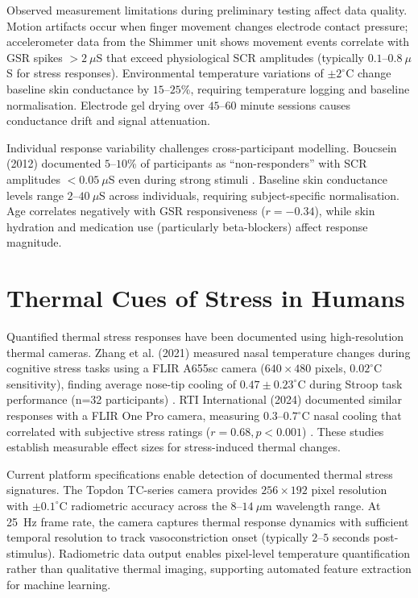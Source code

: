 \documentclass{report}
\begin{document}
Observed measurement limitations during preliminary testing affect data quality. Motion artifacts occur when finger movement changes electrode contact pressure; accelerometer data from the Shimmer unit shows movement events correlate with GSR spikes $>2~\mu$S that exceed physiological SCR amplitudes (typically $0.1$--$0.8~\mu$S for stress responses). Environmental temperature variations of $\pm 2^{\circ}$C change baseline skin conductance by $15$--$25$\%, requiring temperature logging and baseline normalisation. Electrode gel drying over $45$--$60$ minute sessions causes conductance drift and signal attenuation.

Individual response variability challenges cross-participant modelling. Boucsein (2012) documented $5$--$10$\% of participants as ``non-responders'' with SCR amplitudes $<0.05~\mu$S even during strong stimuli \cite{boucsein2012}. Baseline skin conductance levels range $2$--$40~\mu$S across individuals, requiring subject-specific normalisation. Age correlates negatively with GSR responsiveness ($r = -0.34$), while skin hydration and medication use (particularly beta-blockers) affect response magnitude.


\section{Thermal Cues of Stress in Humans}
\label{sec:thermal_cues}

Quantified thermal stress responses have been documented using high-resolution thermal cameras. Zhang et al. (2021) measured nasal temperature changes during cognitive stress tasks using a FLIR A655sc camera ($640 \times 480$ pixels, $0.02^{\circ}$C sensitivity), finding average nose-tip cooling of $0.47 \pm 0.23^{\circ}$C during Stroop task performance (n=32 participants) \cite{zhang2021}. RTI International (2024) documented similar responses with a FLIR One Pro camera, measuring $0.3$--$0.7^{\circ}$C nasal cooling that correlated with subjective stress ratings ($r = 0.68, p < 0.001$) \cite{rti2024}. These studies establish measurable effect sizes for stress-induced thermal changes.

Current platform specifications enable detection of documented thermal stress signatures. The Topdon TC-series camera provides $256 \times 192$ pixel resolution with $\pm 0.1^{\circ}$C radiometric accuracy across the $8$--$14~\mu$m wavelength range. At 25~Hz frame rate, the camera captures thermal response dynamics with sufficient temporal resolution to track vasoconstriction onset (typically $2$--$5$ seconds post-stimulus). Radiometric data output enables pixel-level temperature quantification rather than qualitative thermal imaging, supporting automated feature extraction for machine learning.
\end{document}

